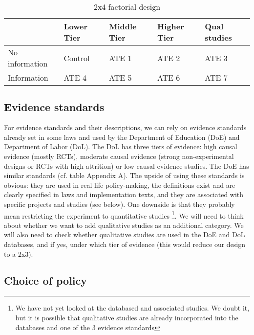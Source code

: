 \documentclass[12pt,final,fleqn]{article}
\theoremstyle{plain}
\begin{document}
\begin{table}[H]
\centering
\caption{2x4 factorial design}
\bigbreak
\begin{tabular}{|l|l|l|l|l|}
\hline
               & Lower Tier & Middle Tier & Higher Tier & Qual studies      \\ \hline
No information & Control    & ATE 1        & ATE 2        & ATE 3             \\ \hline
Information    & ATE 4       & ATE 5        & ATE 6        & ATE 7             \\ \hline
\end{tabular}
\end{table}

\subsection{Evidence standards} \label{sec:Evidence}

For evidence standards and their descriptions, we can rely on evidence standards already set in some laws and used by the Department of Education (DoE) and Department of Labor (DoL). The DoL has three tiers of evidence: high causal evidence (mostly RCTs), moderate causal evidence (strong non-experimental designs or RCTs with high attrition) or low causal evidence studies. The DoE has similar standards (cf. table Appendix A). The upside of using these standards is obvious: they are used in real life policy-making, the definitions exist and are clearly specified in laws and implementation texts, and they are associated with specific projects and studies (see below). One downside is that they probably mean restricting the experiment to quantitative studies \footnote{We have not yet looked at the databased and associated studies. We doubt it, but it is possible that qualitative studies are already incorporated into the databases and one of the 3 evidence standards}. We will need to think about whether we want to add qualitative studies as an additional category. We will also need to check whether qualitative studies are used in the DoE and DoL databases, and if yes, under which tier of evidence (this would reduce our design to a 2x3). 

\subsection{Choice of policy} \label{sec: Policy}
\end{document}
